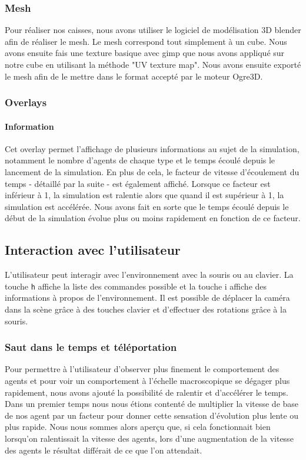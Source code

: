 \subsubsection{Mesh}
Pour réaliser nos caisses, nous avons utiliser le logiciel de modélisation 3D
blender afin de réaliser le mesh. Le mesh correspond tout simplement à un
cube. Nous avons ensuite fais une texture basique avec gimp que nous avons
appliqué sur notre cube en utilisant la méthode "UV texture map".
Nous avons ensuite exporté le mesh afin de le mettre dans le format
accepté par le moteur Ogre3D.


\subsubsection{Overlays}

\paragraph{Information}
Cet overlay permet l'affichage de plusieurs informations au sujet de la
simulation, notamment le nombre d'agents de chaque type et le temps écoulé
depuis le lancement de la simulation.
En plus de cela, le facteur de vitesse d'écoulement du temps - détaillé par la
suite - est également affiché. Lorsque ce facteur est inférieur à 1, la
simulation est ralentie alors que quand il est supérieur à 1, la simulation
est accélérée. Nous avons fait en sorte que le temps écoulé depuis le début de
la simulation évolue plus ou moins rapidement en fonction de ce facteur.

\subsection{Interaction avec l'utilisateur}

L'utilisateur peut interagir avec l'environnement avec la souris ou au
clavier. La touche \verb!h! affiche la liste des commandes possible et la
touche i affiche des informations à propos de l'environnement.
Il est possible de déplacer la caméra dans la scène grâce à des touches
clavier et d'effectuer des rotations grâce à la souris.

\subsubsection{Saut dans le temps et téléportation}
Pour permettre à l'utilisateur d'observer plus finement le comportement des
agents et pour voir un comportement à l'échelle macroscopique se dégager plus
rapidement, nous avons ajouté la possibilité de ralentir et d'accélérer le
temps. Dans un premier temps nous nous étions contenté de multiplier la
vitesse de base de nos agent par un facteur pour donner cette sensation
d'évolution plus lente ou plus rapide. Nous nous sommes alors aperçu que, si
cela fonctionnait bien lorsqu'on ralentissait la vitesse des agents, lors
d'une augmentation de la vitesse des agents le résultat différait de ce que
l'on attendait.


